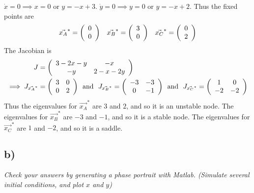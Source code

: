 \documentclass[12pt]{article}
\begin{document}
$\dot{x} = 0 \implies x = 0$ or $y = -x + 3$.  $\dot{y} = 0 \implies y = 0$ or $y = -x + 2$.  Thus the fixed points are
\begin{align*}
	\vec{x_A}^* = \qty(\begin{array}{c}0 \\ 0\end{array})\ \ \ \vec{x_B}^* = \qty(\begin{array}{c}3 \\ 0\end{array})\ \ \ \vec{x_C}^* = \qty(\begin{array}{c}0 \\ 2\end{array})
\end{align*}
The Jacobian is
\begin{align*}
	J &= \qty(\begin{array}{cc}
		3 - 2x - y & -x \\
		-y & 2 - x - 2y
	\end{array}) \\
	\implies J_{\vec{x_A}^*} &= \qty(\begin{array}{cc}
		3 & 0 \\
		0 & 2
	\end{array})\ \ \text{and}\ \ J_{\vec{x_B}^*} = \qty(\begin{array}{cc}
		-3 & -3 \\
		0 & -1
	\end{array})\ \ \text{and}\ \ J_{\vec{x_C}^*} = \qty(\begin{array}{cc}
		1 & 0 \\
		-2 & -2
	\end{array})
\end{align*}
Thus the eigenvalues for $\vec{x_A}^*$ are $3$ and $2$, and so it is an unstable node.  The eigenvalues for $\vec{x_B}^*$ are $-3$ and $-1$, and so it is a stable node.  The eigenvalues for $\vec{x_C}^*$ are $1$ and $-2$, and so it is a saddle.

\subsection*{ b)}
\emph{Check your answers by generating a phase portrait with Matlab.  (Simulate several initial conditions, and plot $x$ and $y$)}
\end{document}
